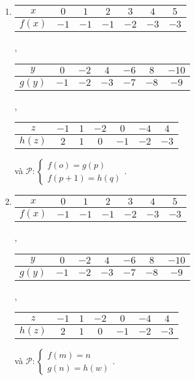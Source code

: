 \begin{enumerate}
   \item
   \begin{tabular}{|c|c|c|c|c|c|c|}
      \hline
      $x$ & $0$ & $1$ & $2$ & $3$ & $4$ & $5$ \\
      \hline
      $f(x)$ & $-1$ & $-1$ & $-1$ & $-2$ & $-3$ & $-3$\\
      \hline
   \end{tabular},
   \begin{tabular}{|c|c|c|c|c|c|c|}
      \hline
      $y$ & $0$ & $-2$ & $4$ & $-6$ & $8$ & $-10$\\
      \hline
      $g(y)$ & $-1$ & $-2$ & $-3$ & $-7$ & $-8$ & $-9$\\
      \hline
   \end{tabular},

   \noindent\begin{tabular}{|c|c|c|c|c|c|c|}
      \hline
      $z$ & $-1$ & $1$ & $-2$ & $0$ & $-4$ & $4$\\
      \hline
      $h(z)$ & $2$ & $1$ & $0$ & $-1$ & $-2$ & $-3$\\
      \hline
   \end{tabular} và $\mathcal{P}:\begin{cases}f(o) = g(p)\\f(p + 1) = h(q)\end{cases}$.

   \item
   \begin{tabular}{|c|c|c|c|c|c|c|}
      \hline
      $x$ & $0$ & $1$ & $2$ & $3$ & $4$ & $5$ \\
      \hline
      $f(x)$ & $-1$ & $-1$ & $-1$ & $-2$ & $-3$ & $-3$\\
      \hline
   \end{tabular},
   \begin{tabular}{|c|c|c|c|c|c|c|}
      \hline
      $y$ & $0$ & $-2$ & $4$ & $-6$ & $8$ & $-10$\\
      \hline
      $g(y)$ & $-1$ & $-2$ & $-3$ & $-7$ & $-8$ & $-9$\\
      \hline
   \end{tabular},

   \noindent\begin{tabular}{|c|c|c|c|c|c|c|}
      \hline
      $z$ & $-1$ & $1$ & $-2$ & $0$ & $-4$ & $4$\\
      \hline
      $h(z)$ & $2$ & $1$ & $0$ & $-1$ & $-2$ & $-3$\\
      \hline
   \end{tabular} và $\mathcal{P}:\begin{cases}f(m) = n\\g(n) = h(w)\end{cases}$.
\end{enumerate}

